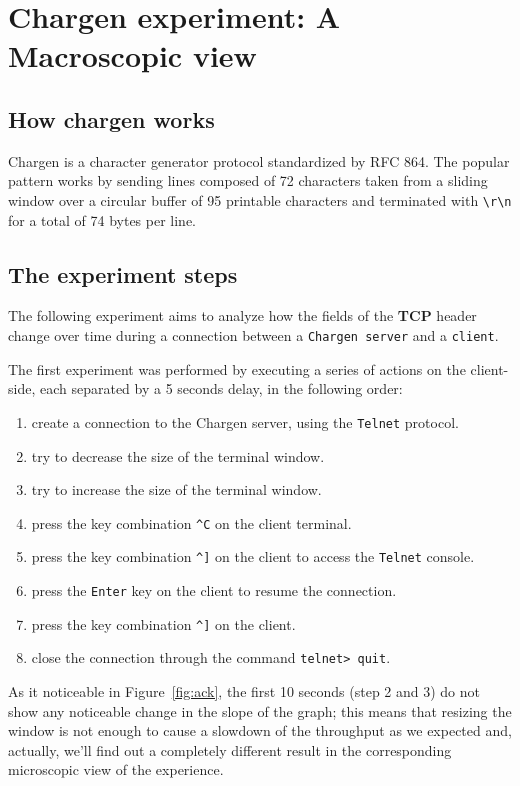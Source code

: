 \documentclass{exam}
\begin{document}
\section{Chargen experiment: A Macroscopic view}
\subsection{How chargen works}
Chargen is a character generator protocol standardized by RFC 864. The popular pattern works by sending lines composed of 72 characters taken from a sliding window over a circular buffer of 95 printable characters and terminated with \verb|\r\n| for a total of 74 bytes per line. 

\subsection{The experiment steps}
The following experiment aims to analyze how the fields of the \textbf{TCP} header change over time during a connection between a \verb|Chargen server| and a \verb|client|.

The first experiment was performed by executing a series of actions on the client-side, each separated by a 5 seconds delay, in the following order:
\begin{enumerate}
    \item create a connection to the Chargen server, using the \verb|Telnet| protocol.
    \item try to decrease the size of the terminal window.
    \item try to increase the size of the terminal window.
    \item press the key combination \verb|^C| on the client terminal.
    \item press the key combination \verb|^]| on the client to access the \verb|Telnet| console.
    \item press the \verb|Enter| key on the client to resume the connection.
    \item press the key combination \verb|^]| on the client.
    \item close the connection through the command \verb|telnet> quit|.
\end{enumerate}
As it noticeable in Figure~\ref{fig:ack}, the first 10 seconds (step 2 and 3) do not show any noticeable change in the slope of the graph; this means that resizing the window is not enough to cause a slowdown of the throughput as we expected and, actually, we'll find out a completely different result in the corresponding microscopic view of the experience.
\end{document}
